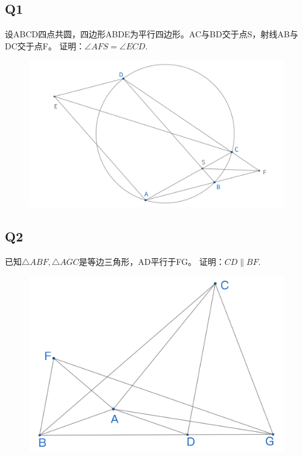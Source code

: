 \documentclass{article}
\begin{document}
\subsection{Q1}
设ABCD四点共圆，四边形ABDE为平行四边形。AC与BD交于点S，射线AB与DC交于点F。
证明：$\angle AFS=\angle ECD.$
\begin{figure}[htbp]
    \centering
    \includegraphics[width=0.9\linewidth]{figures/Q1.png}
\end{figure}


\newpage 
\subsection{Q2}
已知$\triangle ABF, \triangle AGC$是等边三角形，AD平行于FG。
证明：$CD\parallel BF.$
\begin{figure}[htbp]
    \centering
    \includegraphics[width=0.7\linewidth]{figures/Q2.png}
\end{figure}
\end{document}
